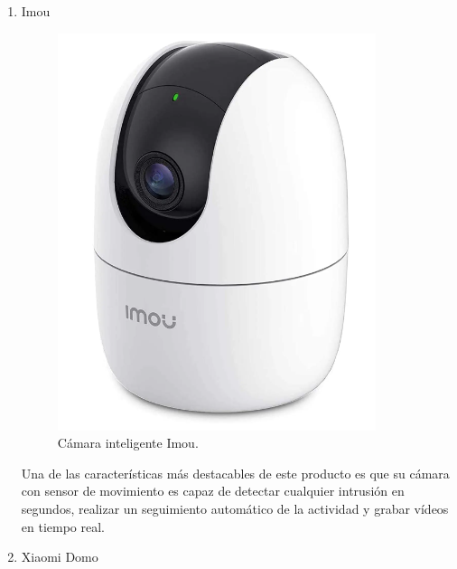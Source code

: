 \begin{enumerate}[label=\alph*)]
    \needspace{3cm}
    \item Imou

    \begin{figure}[H]
    \centering
    \begin{adjustbox}{width=\linewidth/4}
          \includegraphics{media/Imou.png}
    \end{adjustbox}
    \caption{\label{fig:Imou}Cámara inteligente Imou.}
    \end{figure}

    Una de las características más destacables de este producto es que su cámara con sensor de movimiento es capaz de detectar cualquier intrusión en segundos, realizar un seguimiento automático de la actividad y grabar vídeos en tiempo real. 

    \needspace{3cm}
    \item Xiaomi Domo


\end{enumerate}
